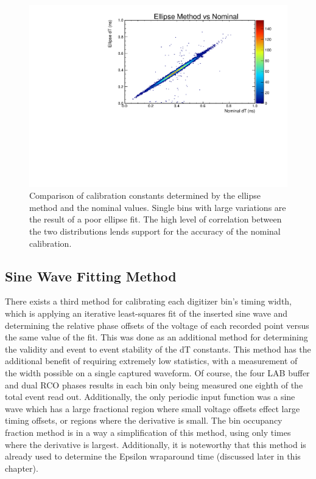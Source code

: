 	\begin{figure}
		\includegraphics[width=\textwidth]{figures/ellipseComparison}
		\caption{Comparison of calibration constants determined by the ellipse method and the nominal values.  Single bins with large variations are the result of a poor ellipse fit.  The high level of correlation between the two distributions lends support for the accuracy of the nominal calibration.}
		\label{fig:ellipseResults}
	\end{figure}


	\subsection{Sine Wave Fitting Method}
	
	There exists a third method for calibrating each digitizer bin's timing width, which is applying an iterative least-squares fit of the inserted sine wave and determining the relative phase offsets of the voltage of each recorded point versus the same value of the fit.  This was done as an additional method for determining the validity and event to event stability of the dT constants.  This method has the additional benefit of requiring extremely low statistics, with a measurement of the width possible on a single captured waveform.  Of course, the four LAB buffer and dual RCO phases results in each bin only being measured one eighth of the total event read out.  Additionally, the only periodic input function was a sine wave which has a large fractional region where small voltage offsets effect large timing offsets, or regions where the derivative is small.  The bin occupancy fraction method is in a way a simplification of this method, using only times where the derivative is largest.  Additionally, it is noteworthy that this method is already used to determine the Epsilon wraparound time (discussed later in this chapter).
	
